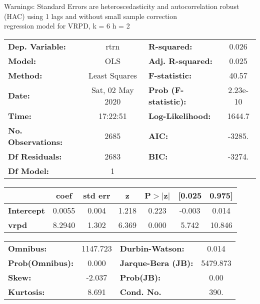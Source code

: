 Warnings: \newline
 [1] Standard Errors are heteroscedasticity and autocorrelation robust (HAC) using 1 lags and without small sample correction\\ 

regression model for VRPD, k = 6 h = 2\begin{center}
\begin{tabular}{lclc}
\toprule
\textbf{Dep. Variable:}    &       rtrn       & \textbf{  R-squared:         } &     0.026   \\
\textbf{Model:}            &       OLS        & \textbf{  Adj. R-squared:    } &     0.025   \\
\textbf{Method:}           &  Least Squares   & \textbf{  F-statistic:       } &     40.57   \\
\textbf{Date:}             & Sat, 02 May 2020 & \textbf{  Prob (F-statistic):} &  2.23e-10   \\
\textbf{Time:}             &     17:22:51     & \textbf{  Log-Likelihood:    } &    1644.7   \\
\textbf{No. Observations:} &        2685      & \textbf{  AIC:               } &    -3285.   \\
\textbf{Df Residuals:}     &        2683      & \textbf{  BIC:               } &    -3274.   \\
\textbf{Df Model:}         &           1      & \textbf{                     } &             \\
\bottomrule
\end{tabular}
\begin{tabular}{lcccccc}
                   & \textbf{coef} & \textbf{std err} & \textbf{z} & \textbf{P$> |$z$|$} & \textbf{[0.025} & \textbf{0.975]}  \\
\midrule
\textbf{Intercept} &       0.0055  &        0.004     &     1.218  &         0.223        &       -0.003    &        0.014     \\
\textbf{vrpd}      &       8.2940  &        1.302     &     6.369  &         0.000        &        5.742    &       10.846     \\
\bottomrule
\end{tabular}
\begin{tabular}{lclc}
\textbf{Omnibus:}       & 1147.723 & \textbf{  Durbin-Watson:     } &    0.014  \\
\textbf{Prob(Omnibus):} &   0.000  & \textbf{  Jarque-Bera (JB):  } & 5479.873  \\
\textbf{Skew:}          &  -2.037  & \textbf{  Prob(JB):          } &     0.00  \\
\textbf{Kurtosis:}      &   8.691  & \textbf{  Cond. No.          } &     390.  \\
\bottomrule
\end{tabular}
\end{center}

